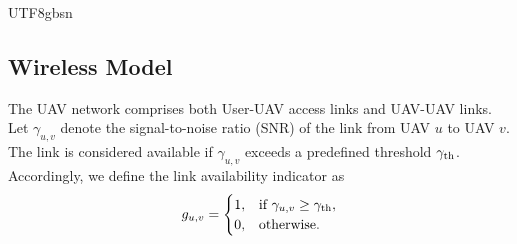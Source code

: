 \documentclass[journal]{IEEEtran}
\begin{document}
\begin{CJK*}{UTF8}{gbsn}
\subsection{Wireless Model}
The UAV network comprises both User-UAV access links and UAV-UAV links. Let \(\gamma_{u,v}\) denote the signal-to-noise ratio (SNR) of the link from UAV \(u\) to UAV \(v\). The link is considered available if \(\gamma_{u,v}\) exceeds a predefined threshold \(\gamma_{\rm th}\). Accordingly, we define the link availability indicator as
\begin{equation}
g_{u,v} =
\begin{cases}
1, & \text{if } \gamma_{u,v} \ge \gamma_{\rm th}, \\
0, & \text{otherwise}.
\end{cases}
\end{equation}





\end{CJK*}
\end{document}
